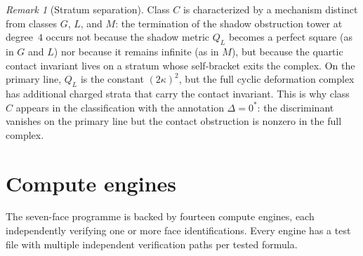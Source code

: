 \documentclass[11pt]{article}
\theoremstyle{plain}
\theoremstyle{definition}
\theoremstyle{remark}
\newtheorem{remark}[theorem]{Remark}
\begin{document}
\begin{remark}[Stratum separation]\label{rem:stratum-separation}
Class $C$ is characterized by a mechanism distinct from classes
$G$, $L$, and $M$: the termination of the shadow obstruction tower
at degree~$4$ occurs not because the shadow metric $Q_L$ becomes
a perfect square (as in $G$ and $L$) nor because it remains
infinite (as in $M$), but because the quartic contact invariant
lives on a stratum whose self-bracket exits the complex. On the
primary line, $Q_L$ is the constant $(2\kappa)^2$, but the full
cyclic deformation complex has additional charged strata that
carry the contact invariant. This is why class $C$ appears in
the classification with the annotation $\Delta=0^{*}$: the
discriminant vanishes on the primary line but the contact
obstruction is nonzero in the full complex.
\end{remark}


\section{Compute engines}\label{sec:compute}

The seven-face programme is backed by fourteen compute engines,
each independently verifying one or more face identifications.
Every engine has a test file with multiple independent
verification paths per tested formula.
\end{document}
